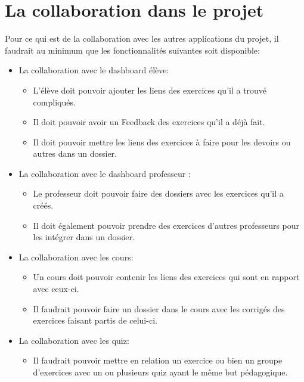 \documentclass[letterpaper,10pt,english]{sphinxmanual}
\begin{document}
\section{La collaboration dans le projet}
\label{projet_debut:la-collaboration-dans-le-projet}
Pour ce qui est de la collaboration avec les autres applications du projet, il faudrait au minimum que les fonctionnalités suivantes soit disponible:
\begin{itemize}
\item {} 
La collaboration avec le dashboard élève:
\begin{itemize}
\item {} 
L'élève doit pouvoir ajouter les liens des exercices qu'il a trouvé compliqués.

\item {} 
Il doit pouvoir avoir un Feedback des exercices qu'il a déjà fait.

\item {} 
Il doit pouvoir mettre les liens des exercices à faire pour les devoirs ou autres dans un dossier.

\end{itemize}

\item {} 
La collaboration avec le dashboard professeur :
\begin{itemize}
\item {} 
Le professeur doit pouvoir faire des dossiers avec les exercices qu'il a créés.

\item {} 
Il doit également pouvoir prendre des exercices d'autres professeurs pour les intégrer dans un dossier.

\end{itemize}

\item {} 
La collaboration avec les cours:
\begin{itemize}
\item {} 
Un cours doit pouvoir contenir les liens des exercices qui sont en rapport avec ceux-ci.

\item {} 
Il faudrait pouvoir faire un dossier dans le cours avec les corrigés des exercices faisant partis de celui-ci.

\end{itemize}

\item {} 
La collaboration avec les quiz:
\begin{itemize}
\item {} 
Il faudrait pouvoir mettre en relation un exercice ou bien un groupe d'exercices avec un ou plusieurs quiz ayant le même but pédagogique.

\end{itemize}

\end{itemize}
\end{document}
